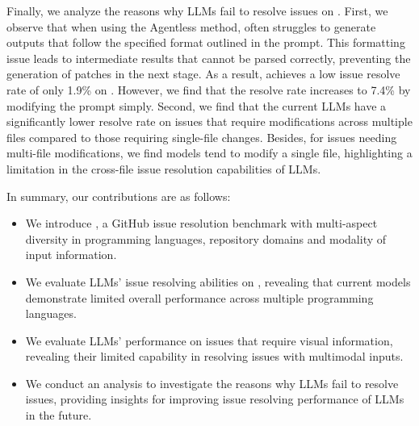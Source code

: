 Finally, we analyze the reasons why LLMs fail to resolve issues on \Swebenchx. First, we observe that when using the Agentless method, \Claude often struggles to generate outputs that follow the specified format outlined in the prompt. This formatting issue leads to intermediate results that cannot be parsed correctly, preventing the generation of patches in the next stage. As a result, \Claude achieves a low issue resolve rate of only 1.9\% on \Swebenchx. However, we find that the resolve rate increases to 7.4\% by modifying the prompt simply. Second, we find that the current LLMs have a significantly lower resolve rate on issues that require modifications across multiple files compared to those requiring single-file changes. Besides, for issues needing multi-file modifications, we find models tend to modify a single file, highlighting a limitation in the cross-file issue resolution capabilities of LLMs.

In summary, our contributions are as follows:


\begin{itemize}[left=10pt]
    \item We introduce \Swebenchx, a GitHub issue resolution benchmark with multi-aspect diversity in programming languages, repository domains and modality of input information. 

    \item We evaluate LLMs' issue resolving abilities on \Swebenchx, revealing that current models demonstrate limited overall performance across multiple programming languages.
    
    \item We evaluate LLMs' performance on issues that require visual information, revealing their limited capability in resolving issues with multimodal inputs.

    \item We conduct an analysis to investigate the reasons why LLMs fail to resolve issues, providing insights for improving issue resolving performance of LLMs in the future.
\end{itemize}

